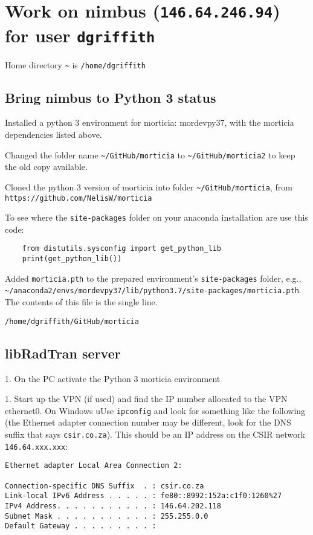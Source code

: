 \section{Work on nimbus (\texttt{146.64.246.94}) for user \texttt{dgriffith}}

Home directory \lstinline{~} is \lstinline{/home/dgriffith}

\subsection{Bring nimbus to Python 3 status}

Installed a python 3 environment for morticia: mordevpy37, with the morticia dependencies listed above.

Changed the folder name  \lstinline{~/GitHub/morticia} to \lstinline{~/GitHub/morticia2} to keep the old copy available.

Cloned the python 3 version of morticia into folder \lstinline{~/GitHub/morticia}, from \lstinline{https://github.com/NelisW/morticia}

To see where the \lstinline{site-packages} folder on your anaconda installation are use this code:

\begin{lstlisting}
    from distutils.sysconfig import get_python_lib
    print(get_python_lib())

\end{lstlisting}
Added \lstinline{morticia.pth} to the prepared environment's \lstinline{site-packages} folder, e.g.,  \lstinline{~/anaconda2/envs/mordevpy37/lib/python3.7/site-packages/morticia.pth}. The contents of this file is the single line. 

    \lstinline{/home/dgriffith/GitHub/morticia}


\subsection{libRadTran server}

1. On the PC activate the Python 3 morticia environment 

1. Start up the VPN (if used) and find the IP number allocated to the VPN ethernet0. On Windows uUse \lstinline{ipconfig} and look for something like the following (the Ethernet adapter connection number may be different, look for the DNS suffix that says \lstinline{csir.co.za}). This should be an IP address on the CSIR network \lstinline{146.64.xxx.xxx}:

\begin{lstlisting}
Ethernet adapter Local Area Connection 2:

Connection-specific DNS Suffix  . : csir.co.za
Link-local IPv6 Address . . . . . : fe80::8992:152a:c1f0:1260%27
IPv4 Address. . . . . . . . . . . : 146.64.202.118
Subnet Mask . . . . . . . . . . . : 255.255.0.0
Default Gateway . . . . . . . . . :
\end{lstlisting}

